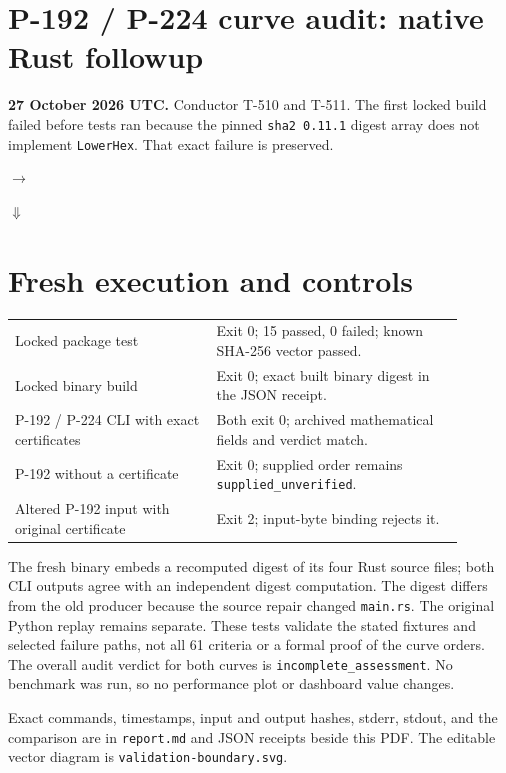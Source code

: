 \documentclass[10pt,a4paper]{article}
\begin{document}
\section*{P-192 / P-224 curve audit: native Rust followup}
\textbf{27 October 2026 UTC.} Conductor T-510 and T-511. The first locked
build failed before tests ran because the pinned \texttt{sha2 0.11.1} digest
array does not implement \texttt{LowerHex}. That exact failure is preserved.

\begin{center}
\quad$\longrightarrow$\quad
{}

$\Downarrow$

\end{center}

\section*{Fresh execution and controls}
\begin{tabular}{>{\raggedright\arraybackslash}p{0.40\linewidth}p{0.49\linewidth}}
Locked package test & Exit 0; 15 passed, 0 failed; known SHA-256 vector passed.\\
Locked binary build & Exit 0; exact built binary digest in the JSON receipt.\\
P-192 / P-224 CLI with exact certificates & Both exit 0; archived mathematical fields and verdict match.\\
P-192 without a certificate & Exit 0; supplied order remains \texttt{supplied\_unverified}.\\
Altered P-192 input with original certificate & Exit 2; input-byte binding rejects it.\\
\end{tabular}

The fresh binary embeds a recomputed digest of its four Rust source files;
both CLI outputs agree with an independent digest computation. The digest
differs from the old producer because the source repair changed
\texttt{main.rs}. The original Python replay remains separate. These tests
validate the stated fixtures and selected failure paths, not all 61 criteria
or a formal proof of the curve orders. The overall audit verdict for both
curves is \texttt{incomplete\_assessment}. No benchmark was run, so no
performance plot or dashboard value changes.

Exact commands, timestamps, input and output hashes, stderr, stdout, and
the comparison are in \texttt{report.md} and JSON receipts beside this PDF.
The editable vector diagram is \texttt{validation-boundary.svg}.
\end{document}
